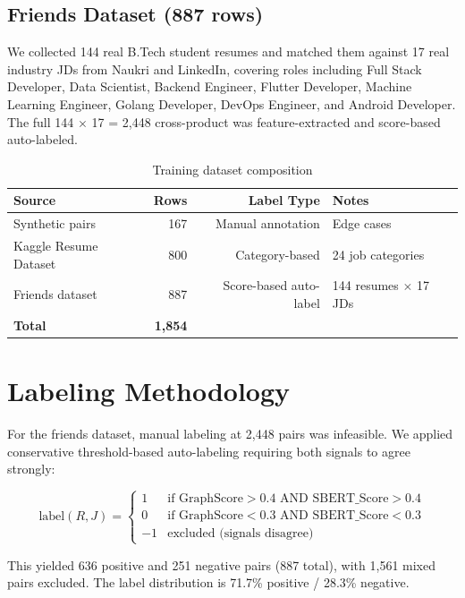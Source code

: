 \documentclass[12pt,a4paper]{report}
\begin{document}
\subsection{Friends Dataset (887 rows)}

We collected 144 real B.Tech student resumes and matched them against 17 real industry JDs from Naukri and LinkedIn, covering roles including Full Stack Developer, Data Scientist, Backend Engineer, Flutter Developer, Machine Learning Engineer, Golang Developer, DevOps Engineer, and Android Developer. The full 144 $\times$ 17 = 2,448 cross-product was feature-extracted and score-based auto-labeled.

\begin{table}[h]
\centering
\caption{Training dataset composition}
\label{tab:dataset}
\begin{tabular}{lrrl}
\toprule
\textbf{Source} & \textbf{Rows} & \textbf{Label Type} & \textbf{Notes} \\
\midrule
Synthetic pairs & 167 & Manual annotation & Edge cases \\
Kaggle Resume Dataset & 800 & Category-based & 24 job categories \\
Friends dataset & 887 & Score-based auto-label & 144 resumes $\times$ 17 JDs \\
\midrule
\textbf{Total} & \textbf{1,854} & & \\
\bottomrule
\end{tabular}
\end{table}

\section{Labeling Methodology}

For the friends dataset, manual labeling at 2,448 pairs was infeasible. We applied conservative threshold-based auto-labeling requiring both signals to agree strongly:

\begin{equation}
\text{label}(R, J) = \begin{cases}
1 & \text{if } \text{GraphScore} > 0.4 \text{ AND } \text{SBERT\_Score} > 0.4 \\
0 & \text{if } \text{GraphScore} < 0.3 \text{ AND } \text{SBERT\_Score} < 0.3 \\
-1 & \text{excluded (signals disagree)}
\end{cases}
\end{equation}

This yielded 636 positive and 251 negative pairs (887 total), with 1,561 mixed pairs excluded. The label distribution is 71.7\% positive / 28.3\% negative.
\end{document}
